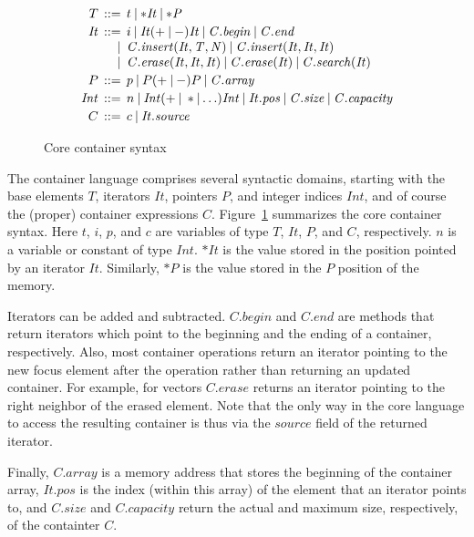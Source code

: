 \documentclass[conference]{IEEEtran}
\begin{document}
\begin{figure}
\[\begin{array}{r@{\:\:}r@{\:\:}l}
  T   & ::= &
    t \:|\: \mathit{*It} \:|\: \mathit{*P}
\\[0.5ex]
   \mathit{It} & ::= &
     i \:|\: \mathit{It} (+ \:|\: -) \mathit{It}
       \:|\: \mathit{C.begin} \:|\: \mathit{C.end}
\\  & | &
     \mathit{C.insert(It, T, N)} \:|\: \mathit{C.insert(It, It, It)}
\\  & | &
     \mathit{C.erase(It, It, It)} \:|\: \mathit{C.erase(It)} \:|\: \mathit{C.search(It)}
\\[0.5ex]
   P  & ::= &
     p \:|\: P (+ \:|\: - ) P
       \:|\: \mathit{C.array}
\\[0.5ex]
  \mathit{Int}  & ::= &
     n \:|\: \mathit{Int} (+ \:|\: * | \ldots) \mathit{Int}
       \:|\: \mathit{It.pos}
       \:|\: \mathit{C.size} \: | \: \mathit{C.capacity}
\\[0.5ex]
   C  & ::= &
     c \:|\: \mathit{It.source}
  \end{array}
\]
  \caption{\label{ccl-fig}Core container syntax}
\end{figure}

The container language comprises several syntactic domains, starting with the
base elements $\mathit{T}$, iterators $\mathit{It}$, pointers $\mathit{P}$, and
integer indices $\mathit{Int}$, and of course the (proper) container
expressions $\mathit{C}$.  Figure~\ref{ccl-fig} summarizes the core container
syntax. Here $t$, $i$, $p$, and $c$ are variables of type $T$, $\mathit{It}$,
$P$, and $C$, respectively.  $n$ is a variable or constant of type
$\mathit{Int}$.
%
$\mathit{*It}$ is the value stored in the position pointed
by an iterator $\mathit{It}$. Similarly, $\mathit{*P}$ is the value
stored in the $\mathit{P}$ position of the memory.

Iterators can be added and subtracted.  $\mathit{C.begin}$ and $\mathit{C.end}$
are methods that return iterators which point to the beginning and the ending
of a container, respectively.  Also, most container operations return an
iterator pointing to the new focus element after the operation rather than
returning an updated container. For example, for vectors $\mathit{C.erase}$
returns an iterator pointing to the right neighbor of the erased element.
Note that the only way in the core language to access the resulting container
is thus via the $\mathit{source}$ field of the returned iterator.

Finally, $\mathit{C.array}$ is a memory address that stores the beginning of
the container array, $\mathit{It.pos}$ is the index (within this array) of the
element that an iterator points to, and $\mathit{C.size}$ and
$\mathit{C.capacity}$ return the actual and maximum size, respectively, of the
containter $C$.
\end{document}
